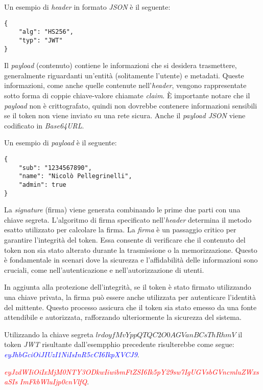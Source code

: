 \noindent Un esempio di \emph{header} in formato \emph{JSON} è il seguente:
\begin{verbatim}
{
	"alg": "HS256",
	"typ": "JWT"
}
\end{verbatim}

Il \emph{payload} (contenuto) contiene le informazioni che si desidera trasmettere, generalmente riguardanti un'entità (solitamente l'utente) e metadati.
Queste informazioni, come anche quelle contenute nell'\emph{header}, vengono rappresentate sotto forma di coppie chiave-valore chiamate \emph{claim}.
È importante notare che il \emph{payload} non è crittografato, quindi non dovrebbe contenere informazioni sensibili se il token non viene inviato su una rete sicura.
Anche il \emph{payload JSON} viene codificato in \emph{Base64URL}.

\noindent Un esempio di \emph{payload} è il seguente:
\begin{verbatim}
{
	"sub": "1234567890",
	"name": "Nicolò Pellegrinelli",
	"admin": true
}
\end{verbatim}

La \emph{signature} (firma) viene generata combinando le prime due parti con una chiave segreta.
L'algoritmo di firma specificato nell'\emph{header} determina il metodo esatto utilizzato per calcolare la firma.
La \emph{firma} è un passaggio critico per garantire l'integrità del token.
Essa consente di verificare che il contenuto del token non sia stato alterato durante la trasmissione o la memorizzazione.
Questo è fondamentale in scenari dove la sicurezza e l'affidabilità delle informazioni sono cruciali, come nell'autenticazione e nell'autorizzazione di utenti.

In aggiunta alla protezione dell'integrità, se il token è stato firmato utilizzando una chiave privata, la firma può essere anche utilizzata per autenticare l'identità del mittente.
Questo processo assicura che il token sia stato emesso da una fonte attendibile e autorizzata, rafforzando ulteriormente la sicurezza del sistema.

Utilizzando la chiave segreta $lrdoyfMvYppQTQC2O0AGVanBCsThRhmV$ il token \emph{JWT} risultante dall'esempphio precedente risulterebbe come segue: \\


\noindent \emph{\textcolor{blue}{eyJhbGciOiJIUzI1NiIsInR5cCI6IkpXVCJ9}}.

\noindent \emph{\textcolor{red}{eyJzdWIiOiIxMjM0NTY3ODkwIiwibmFtZSI6Ik5pY29sw7IgUGVsbGVncmluZWxsaSIs}}
\noindent \emph{\textcolor{red}{ImFkbWluIjp0cnVlfQ}}.

